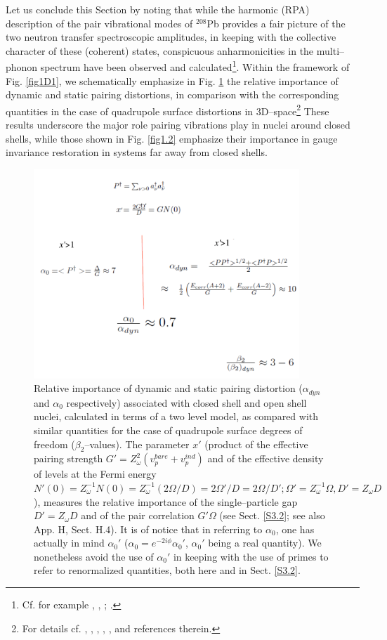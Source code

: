 Let us conclude this Section by noting that while the harmonic (RPA) description of the pair vibrational modes of $^{208}$Pb provides a fair picture of the two neutron transfer spectroscopic amplitudes, in keeping with the collective character of these (coherent) states, conspicuous anharmonicities in the multi--phonon spectrum have been observed and calculated\footnote{Cf. for example \cite{Flynn:72}, \cite{Lanford:73}, \cite{Bortignon:78}; \cite{Clark:06}.}. Within the framework of Fig. \ref{fig1D1}, we schematically emphasize in Fig. \ref{fig1_E8} the relative importance of dynamic and static pairing distortions, in comparison with the corresponding quantities in the case of quadrupole surface distortions in 3D--space\footnote{For details cf. \cite{Bes:77}, \cite{Broglia:68}, \cite{Bes:88},\cite{Barranco:87a} \cite{Shimizu:89}, \cite{Shimizu:13}, \cite{Vaquero:13} and references therein.}  These results underscore the major role pairing vibrations play in nuclei around closed shells, while those shown in Fig. \ref{fig1.2} emphasize their importance in gauge invariance restoration in systems far away from closed shells.
  \begin{figure}
  \centerline{\includegraphics*[width=10cm,angle=0]{nutshell/figs/fig1E8.pdf}}
  \caption[Dynamic and static pairing.]{Relative importance of dynamic and static pairing distortion ($\alpha_{dyn}$ and $\alpha_0$ respectively) associated with closed shell and open shell  nuclei, calculated in terms of a two level model, as compared with similar quantities for the case of quadrupole surface degrees of freedom ($\beta_2$--values). The parameter $x'$ (product of the effective pairing strength $G'=Z_\omega^2(v_p^{bare}+v_p^{ind})$ and of the effective density of levels at the Fermi energy $N'(0)=Z_\omega^{-1}N(0)=Z^{-1}_\omega(2\Omega/D)=2\Omega'/D=2\Omega/D';\Omega'=Z_\omega^{-1}\Omega,D'=Z_\omega D$), measures the relative importance of the single--particle gap $D'=Z_\omega D$ and of the pair correlation $G'\Omega$ (see Sect. \ref{S3.2};  see also \cite{Brink:05} App. H, Sect. H.4). It is of notice that in referring to $\alpha_0$, one has actually in mind $\alpha_0'$ ($\alpha_0=e^{-2i\phi}\alpha_0'$, $\alpha_0'$ being a real quantity). We nonetheless avoid the use of $\alpha_0'$ in keeping with the use of primes to refer to renormalized quantities, both here and in Sect. \ref{S3.2}. }\label{fig1_E8}
  \end{figure}

